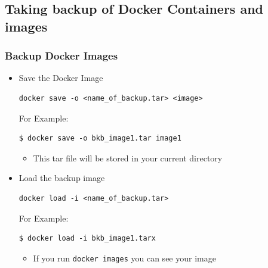 \documentclass[11pt]{article}
\begin{document}
\subsection{Taking backup of Docker Containers and images}
\label{sec:orgheadline36}
\subsubsection{Backup Docker Images}
\label{sec:orgheadline34}
\begin{itemize}
\item Save the Docker Image
\begin{verbatim}
docker save -o <name_of_backup.tar> <image>
\end{verbatim}
For Example:
\begin{verbatim}
$ docker save -o bkb_image1.tar image1
\end{verbatim}
\begin{itemize}
\item This tar file will be stored in your current directory
\end{itemize}

\item Load the backup image
\begin{verbatim}
docker load -i <name_of_backup.tar>
\end{verbatim}
For Example:
\begin{verbatim}
$ docker load -i bkb_image1.tarx
\end{verbatim}
\begin{itemize}
\item If you run \texttt{docker images} you can see your image
\end{itemize}
\end{itemize}
\end{document}
